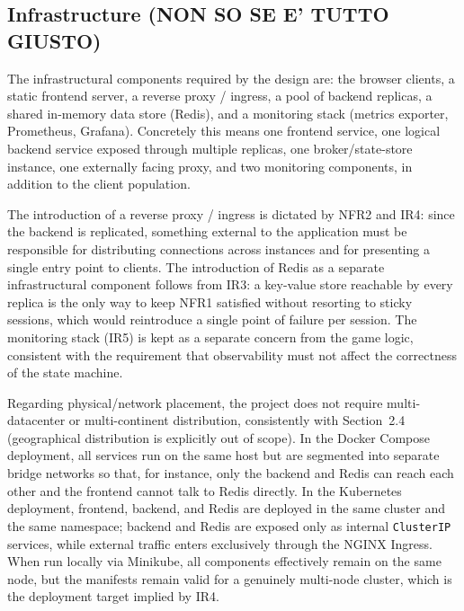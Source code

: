 \documentclass{scrartcl}
\begin{document}
\subsection{Infrastructure (NON SO SE E' TUTTO GIUSTO)}

The infrastructural components required by the design are: the browser clients, a static frontend server, a reverse proxy / ingress, a pool of backend replicas, a shared in-memory data store (Redis), and a monitoring stack (metrics exporter, Prometheus, Grafana). Concretely this means one frontend service, one logical backend service exposed through multiple replicas, one broker/state-store instance, one externally facing proxy, and two monitoring components, in addition to the client population.

The introduction of a reverse proxy / ingress is dictated by NFR2 and IR4: since the backend is replicated, something external to the application must be responsible for distributing connections across instances and for presenting a single entry point to clients. The introduction of Redis as a separate infrastructural component follows from IR3: a key-value store reachable by every replica is the only way to keep NFR1 satisfied without resorting to sticky sessions, which would reintroduce a single point of failure per session. The monitoring stack (IR5) is kept as a separate concern from the game logic, consistent with the requirement that observability must not affect the correctness of the state machine.

Regarding physical/network placement, the project does not require multi-datacenter or multi-continent distribution, consistently with Section~2.4 (geographical distribution is explicitly out of scope). In the Docker Compose deployment, all services run on the same host but are segmented into separate bridge networks so that, for instance, only the backend and Redis can reach each other and the frontend cannot talk to Redis directly. In the Kubernetes deployment, frontend, backend, and Redis are deployed in the same cluster and the same namespace; backend and Redis are exposed only as internal \texttt{ClusterIP} services, while external traffic enters exclusively through the NGINX Ingress. When run locally via Minikube, all components effectively remain on the same node, but the manifests remain valid for a genuinely multi-node cluster, which is the deployment target implied by IR4.
\end{document}

